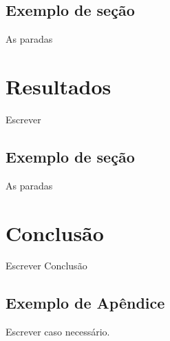 \documentclass[
	12pt,				%
	openright,			%
	oneside,			%
	a4paper,			%
	english,			%
	french,				%
	spanish,			%
	brazil,				%
	]{abntex2}
\begin{document}
\section{Exemplo de seção}

As paradas

\chapter{Resultados}
Escrever

\section{Exemplo de seção}

As paradas


\chapter{Conclusão}

Escrever Conclusão

\postextual



%
%


\begin{apendicesenv}

\partapendices

\chapter{Exemplo de Apêndice}

Escrever caso necessário.

\end{apendicesenv}
\end{document}
